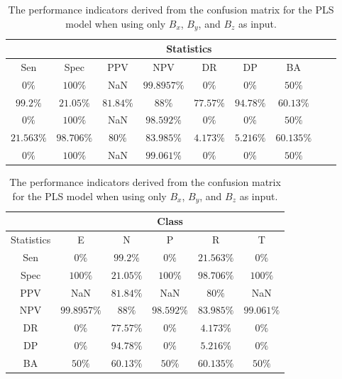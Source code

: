 \begin{table}[!ht]
	\centering
	\begin{tabular}{|c|c|c|c|c|c|c|c|c|}
		\hline
		 & \multicolumn{7}{c|}{Statistics} \\ \hline
		Sen & Spec & PPV & NPV & DR & DP & BA \\ \hline
		$0\%$ & $100\%$ & NaN & $99.8957\%$ & $0\%$ & $0\%$ & $50\%$ \\ \hline
		$99.2\%$ & $21.05\%$ & $81.84\%$ & $88\%$ & $77.57\%$ & $94.78\%$ & $60.13\%$ \\ \hline
		$0\%$ & $100\%$ & NaN & $98.592\%$ & $0\%$ & $0\%$ & $50\%$ \\ \hline
		$21.563\%$ & $98.706\%$ & $80\%$ & $83.985\%$ & $4.173\%$ & $5.216\%$ & $60.135\%$ \\ \hline
		$0\%$ & $100\%$ & NaN & $99.061\%$ & $0\%$ & $0\%$ & $50\%$ \\ \hline
	\end{tabular}
	\caption{The performance indicators derived from the confusion matrix for the PLS model when using only $B_{x}$, $B_{y}$, and $B_{z}$ as input.}
	\label{tab:cs:coord:pls}
\end{table}

\begin{table}[!ht]
	\centering
	\begin{tabular}{|c|c|c|c|c|c|}
		\hline
		 & \multicolumn{5}{c|}{Class} \\ \hline
		Statistics & E & N & P & R & T \\ \hline
		Sen & $0\%$ & $99.2\%$ & $0\%$ & $21.563\%$ & $0\%$ \\ \hline
		Spec & $100\%$ & $21.05\%$ & $100\%$ & $98.706\%$ & $100\%$ \\ \hline
		PPV & NaN & $81.84\%$ & NaN & $80\%$ & NaN \\ \hline
		NPV & $99.8957\%$ & $88\%$ & $98.592\%$ & $83.985\%$ & $99.061\%$ \\ \hline
		DR & $0\%$ & $77.57\%$ & $0\%$ & $4.173\%$ & $0\%$ \\ \hline
		DP & $0\%$ & $94.78\%$ & $0\%$ & $5.216\%$ & $0\%$ \\ \hline
		BA & $50\%$ & $60.13\%$ & $50\%$ & $60.135\%$ & $50\%$ \\ \hline
	\end{tabular}
	\caption{The performance indicators derived from the confusion matrix for the PLS model when using only $B_{x}$, $B_{y}$, and $B_{z}$ as input.}
	\label{tab:cs:reverse:coord:pls}
\end{table}

